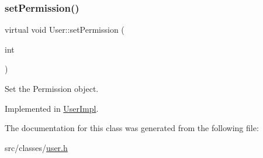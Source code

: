 \subsubsection{\texorpdfstring{set\+Permission()}{setPermission()}}
{\footnotesize\ttfamily virtual void User\+::set\+Permission (\begin{DoxyParamCaption}\item[{int}]{ }\end{DoxyParamCaption})\hspace{0.3cm}{\ttfamily [pure virtual]}}



Set the Permission object. 



Implemented in \hyperlink{classUserImpl_ac273d611344f59bf69e6eabb412e84ee}{User\+Impl}.



The documentation for this class was generated from the following file\+:\begin{DoxyCompactItemize}
\item 
src/classes/\hyperlink{user_8h}{user.\+h}\end{DoxyCompactItemize}
